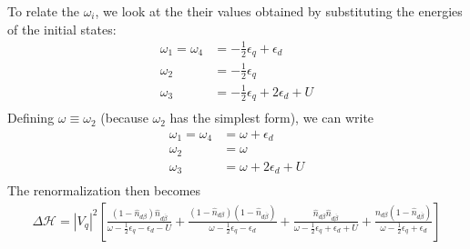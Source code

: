 \documentclass[twoside]{report}
\numberwithin{equation}{section}
\begin{document}
To relate the \(\omega_i\), we look at the their values obtained by substituting the energies of the initial states:
\begin{equation}\begin{aligned}
	\omega_1 = \omega_4 &= -\frac{1}{2}\epsilon_q + \epsilon_d\\
	\omega_2 &= -\frac{1}{2}\epsilon_q\\
	\omega_3 &= -\frac{1}{2}\epsilon_q + 2\epsilon_d + U\\
\end{aligned}\end{equation}
Defining \(\omega \equiv \omega_2\) (because \(\omega_2\) has the simplest form), we can write
\begin{equation}\begin{aligned}
	\omega_1 = \omega_4 &= \omega + \epsilon_d\\
	\omega_2 &= \omega\\
	\omega_3 &= \omega + 2\epsilon_d + U\\
\end{aligned}\end{equation}
The renormalization then becomes
\begin{equation}\begin{aligned}
	\label{vanilla:siam:ren}
	\Delta \mathcal{H} = |V_q|^2 \left[\frac{\left(1 - \hat n_{d\beta}\right)\hat n_{d\overline\beta}}{\omega - \frac{1}{2}\epsilon_q - \epsilon_d - U} + \frac{\left(1 - \hat n_{d\beta}\right)\left( 1-\hat n_{d\overline\beta} \right)}{\omega - \frac{1}{2}\epsilon_q - \epsilon_d} + \frac{\hat n_{d\beta} \hat n_{d\overline\beta}}{\omega - \frac{1}{2}\epsilon_q + \epsilon_d + U} + \frac{\hat n_{d\beta}\left( 1- \hat n_{d\overline\beta}\right) }{\omega - \frac{1}{2}\epsilon_q + \epsilon_d}\right]
\end{aligned}\end{equation}
\end{document}
